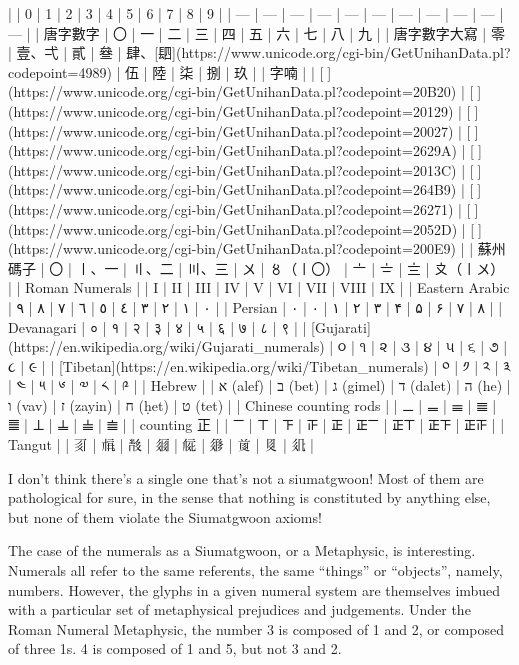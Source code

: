         |  | 0 | 1 | 2 | 3 | 4 | 5 | 6 | 7 | 8 | 9 |
        | --- | --- | --- | --- | --- | --- | --- | --- | --- | --- | --- |
        | 唐字數字 | 〇 | 一 | 二 | 三 | 四 | 五 | 六 | 七 | 八 | 九 |
        | 唐字數字大寫 | 零 | 壹、弌 | 貳 | 叄 | 肆、[䦉](https://www.unicode.org/cgi-bin/GetUnihanData.pl?codepoint=4989) | 伍 | 陸 | 柒 | 捌 | 玖 |
        | 字喃 |  | [𠬠](https://www.unicode.org/cgi-bin/GetUnihanData.pl?codepoint=20B20) | [𠄩](https://www.unicode.org/cgi-bin/GetUnihanData.pl?codepoint=20129) | [𠀧](https://www.unicode.org/cgi-bin/GetUnihanData.pl?codepoint=20027) | [𦊚](https://www.unicode.org/cgi-bin/GetUnihanData.pl?codepoint=2629A) | [𠄼](https://www.unicode.org/cgi-bin/GetUnihanData.pl?codepoint=2013C) | [𦒹](https://www.unicode.org/cgi-bin/GetUnihanData.pl?codepoint=264B9) | [𦉱](https://www.unicode.org/cgi-bin/GetUnihanData.pl?codepoint=26271) | [𠔭](https://www.unicode.org/cgi-bin/GetUnihanData.pl?codepoint=2052D) | [𠃩](https://www.unicode.org/cgi-bin/GetUnihanData.pl?codepoint=200E9) |
        | 蘇州碼子 | 〇 | 〡、一 | 〢、二 | 〣、三 | 〤 | 〥（〡〇） | 〦 | 〧 | 〨 | 〩（〡〤） |
        | Roman Numerals |  | I | II | III | IV | V | VI | VII | VIII | IX |
        | Eastern Arabic | ٠ | ١ | ٢ | ٣ | ٤ | ٥ | ٦ | ٧ | ٨ | ٩ |
        | Persian | ٠ | ۰ | ۱ | ۲ | ۳ | ۴ | ۵ | ۶ | ۷ | ۸ |
        | Devanagari | ० | १ | २ | ३ | ४ | ५ | ६ | ७ | ८ | ९ |
        | [Gujarati](https://en.wikipedia.org/wiki/Gujarati_numerals) | ૦ | ૧ | ૨ | ૩ | ૪ | ૫ | ૬ | ૭ | ૮ | ૯ |
        | [Tibetan](https://en.wikipedia.org/wiki/Tibetan_numerals) | ༠ | ༡ | ༢ | ༣ | ༤ | ༥ | ༦ | ༧ | ༨ | ༩ |
        | Hebrew |  | א‎ (alef) | ב‎ (bet) | ג‎ (gimel) | ד‎ (dalet) | ה‎ (he) | ו‎ (vav) | ז‎ (zayin) | ח‎ (ḥet) | ט‎ (tet) |
        | Chinese counting rods |  | 𝍠 | 𝍡 | 𝍢 | 𝍣 | 𝍤 | 𝍥 | 𝍦 | 𝍧 | 𝍨 |
        | counting 正 |  | 𝍲 | 𝍳 | 𝍴 | 𝍵 | 𝍶 | 𝍶𝍲 | 𝍶𝍳 | 𝍶𝍴 | 𝍶𝍵 |
        | Tangut  |  | 𘈩 | 𗍫 | 𘕕 | 𗥃 | 𗏁 | 𗤁 | 𗒹 | 𘉋 | 𗢭 |
        
        I don’t think there’s a single one that’s not a siumatgwoon! Most of them are pathological for sure, in the sense that nothing is constituted by anything else, but none of them violate the Siumatgwoon axioms! 
        
        The case of the numerals as a Siumatgwoon, or a Metaphysic, is interesting. Numerals all refer to the same referents, the same “things” or “objects”, namely, numbers. However, the glyphs in a given numeral system are themselves imbued with a particular set of metaphysical prejudices and judgements. Under the Roman Numeral Metaphysic, the number 3 is composed of 1 and 2, or composed of three 1s. 4 is composed of 1 and 5, but not 3 and 2. 
        
